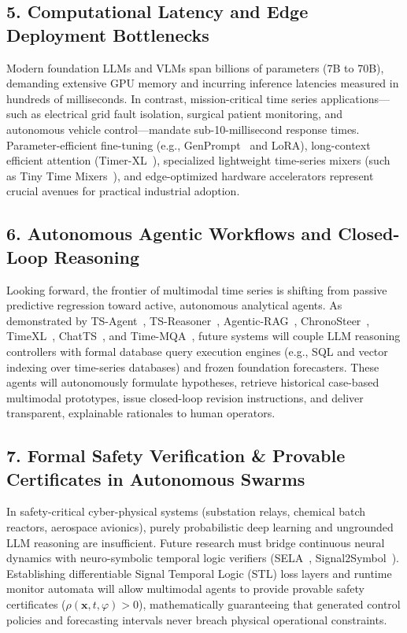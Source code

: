 \subsection{5. Computational Latency and Edge Deployment Bottlenecks}
Modern foundation LLMs and VLMs span billions of parameters (7B to 70B), demanding extensive GPU memory and incurring inference latencies measured in hundreds of milliseconds. In contrast, mission-critical time series applications---such as electrical grid fault isolation, surgical patient monitoring, and autonomous vehicle control---mandate sub-10-millisecond response times. Parameter-efficient fine-tuning (e.g., GenPrompt~\cite{Liu2024GenPrompt} and LoRA), long-context efficient attention (Timer-XL~\cite{Liu2024TimerXL}), specialized lightweight time-series mixers (such as Tiny Time Mixers~\cite{Ekambaram2024TTM}), and edge-optimized hardware accelerators represent crucial avenues for practical industrial adoption.

\subsection{6. Autonomous Agentic Workflows and Closed-Loop Reasoning}
Looking forward, the frontier of multimodal time series is shifting from passive predictive regression toward active, autonomous analytical agents. As demonstrated by TS-Agent~\cite{Liu2025TSAgent}, TS-Reasoner~\cite{Ye2024TSReasoner}, Agentic-RAG~\cite{Ravuru2024AgenticRAG}, ChronoSteer~\cite{Wang2025ChronoSteer}, TimeXL~\cite{Jiang2025TimeXL}, ChatTS~\cite{Zhao2024ChatTS}, and Time-MQA~\cite{Shen2025TimeMQA}, future systems will couple LLM reasoning controllers with formal database query execution engines (e.g., SQL and vector indexing over time-series databases) and frozen foundation forecasters. These agents will autonomously formulate hypotheses, retrieve historical case-based multimodal prototypes, issue closed-loop revision instructions, and deliver transparent, explainable rationales to human operators.

\subsection{7. Formal Safety Verification \& Provable Certificates in Autonomous Swarms}
In safety-critical cyber-physical systems (substation relays, chemical batch reactors, aerospace avionics), purely probabilistic deep learning and ungrounded LLM reasoning are insufficient. Future research must bridge continuous neural dynamics with neuro-symbolic temporal logic verifiers (SELA~\cite{Wan2026GrammarWave}, Signal2Symbol~\cite{Mansour2026Signal2Symbol}). Establishing differentiable Signal Temporal Logic (STL) loss layers and runtime monitor automata will allow multimodal agents to provide provable safety certificates ($\rho(\mathbf{x}, t, \varphi) > 0$), mathematically guaranteeing that generated control policies and forecasting intervals never breach physical operational constraints.

